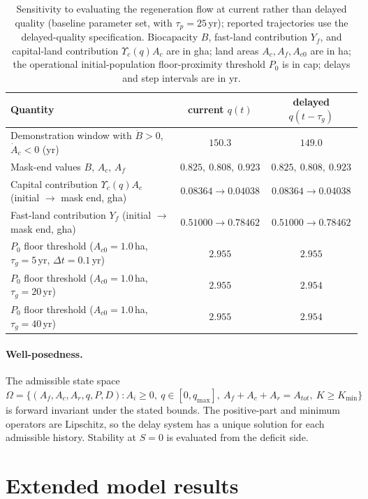 \documentclass[11pt,a4paper]{article}
\newcommand{\Ups}{\Upsilon_c}
\begin{document}
\begin{table}[htbp]
\centering\small
\caption{Sensitivity to evaluating the regeneration flow at current rather than delayed quality (baseline parameter set, with $\tau_p=25$\,yr); reported trajectories use the delayed-quality specification. Biocapacity $B$, fast-land contribution $Y_f$, and capital-land contribution $\Ups(q)A_c$ are in gha; land areas $A_c,A_f,A_{c0}$ are in ha; the operational initial-population floor-proximity threshold $P_0$ is in cap; delays and step intervals are in yr.}
\label{tab:si_delay}
\begin{tabularx}{\textwidth}{>{\raggedright\arraybackslash}Xcc}
\toprule
Quantity & current $q(t)$ & delayed $q(t-\tau_g)$ \\
\midrule
Demonstration window with $\dot B>0$, $\dot A_c<0$ (yr) & $150.3$ & $149.0$ \\
Mask-end values $B$, $A_c$, $A_f$ & $0.825,\ 0.808,\ 0.923$ & $0.825,\ 0.808,\ 0.923$ \\
Capital contribution $\Ups(q)A_c$ (initial $\to$ mask end, gha) & $0.08364\to0.04038$ & $0.08364\to0.04038$ \\
Fast-land contribution $Y_f$ (initial $\to$ mask end, gha) & $0.51000\to0.78462$ & $0.51000\to0.78462$ \\
$P_0$ floor threshold ($A_{c0}=1.0$\,ha, $\tau_g=5$\,yr, $\Delta t=0.1$\,yr) & $2.955$ & $2.955$ \\
$P_0$ floor threshold ($A_{c0}=1.0$\,ha, $\tau_g=20$\,yr) & $2.955$ & $2.954$ \\
$P_0$ floor threshold ($A_{c0}=1.0$\,ha, $\tau_g=40$\,yr) & $2.955$ & $2.954$ \\
\bottomrule
\end{tabularx}
\end{table}

\paragraph{Well-posedness.} The admissible state space $\Omega=\{(A_f,A_c,A_r,q,P,D):A_i\ge0,\ q\in[0,q_{\max}],\ A_f+A_c+A_r=A_{tot},\ K\ge K_{\min}\}$ is forward invariant under the stated bounds. The positive-part and minimum operators are Lipschitz, so the delay system has a unique solution for each admissible history. Stability at $S=0$ is evaluated from the deficit side.

\section{Extended model results}\label{si:results}
\end{document}
